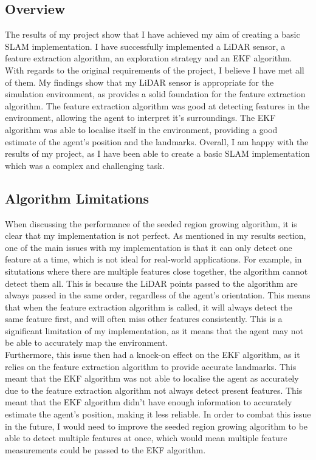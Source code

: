 \documentclass[12pt]{article}
\begin{document}
\subsection{Overview}
The results of my project show that I have achieved my aim of creating a basic SLAM implementation. I have
successfully implemented a LiDAR sensor, a feature extraction algorithm, an exploration strategy and an EKF algorithm. With regards
to the original requirements of the project, I believe I have met all of them. My findings show that my LiDAR sensor is appropriate for
the simulation environment, as provides a solid foundation for the feature extraction algorithm. The feature extraction algorithm was
good at detecting features in the environment, allowing the agent to interpret it's surroundings. The EKF algorithm was able to localise
itself in the environment, providing a good estimate of the agent's position and the landmarks. Overall, I am happy with the results of
my project, as I have been able to create a basic SLAM implementation which was a complex and challenging task.\\

\subsection{Algorithm Limitations}
When discussing the performance of the seeded region growing algorithm, it is clear that my implementation is not perfect. As mentioned in
my results section, one of the
main issues with my implementation is that it can only detect one feature at a time, which is not ideal for real-world applications. For
example, in situtations where there are multiple features close together, the algorithm cannot detect them all. This is because the LiDAR points
passed to the algorithm are always passed in the same order, regardless of the agent's orientation. This means that when the feature extraction
algorithm is called, it will always detect the same feature first, and will often miss other features consistently. This is a significant limitation of my
implementation, as it means that the agent may not be able to accurately map the environment.\\

Furthermore, this issue then had a knock-on effect on the EKF algorithm, as it relies on the feature extraction algorithm to provide
accurate landmarks. This meant that the EKF algorithm was not able to localise the agent as accurately due to the feature
extraction algorithm not always detect present features. This meant that the EKF algorithm didn't have enough information to
accurately estimate the agent's position, making it less reliable. In order to combat this issue in the future, I would need to improve
the seeded region growing algorithm to be able to detect multiple features at once, which would mean multiple feature measurements
could be passed to the EKF algorithm. \\
\end{document}
